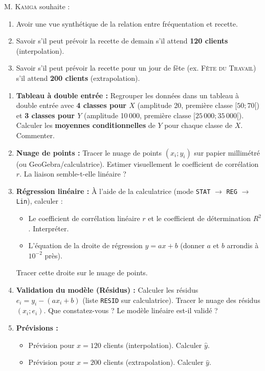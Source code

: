 \documentclass[11pt]{article}
\newcounter{popsec}
\newcounter{popsub}
\newcommand{\courssub}[1]{%
  \stepcounter{popsub}%
  \par\vspace{9pt}\noindent{\popxbold\fontsize{11.5}{13}\selectfont\color{popink}{\color{poporange}\thepopsec.\thepopsub}\hspace{6pt}#1}\par\nopagebreak\vspace{4pt}
}
\begin{document}
M. \textsc{Kamga} souhaite :
\begin{enumerate}
    \item Avoir une vue synthétique de la relation entre fréquentation et recette.
    \item Savoir s'il peut prévoir la recette de demain s'il attend \textbf{120 clients} (interpolation).
    \item Savoir s'il peut prévoir la recette pour un jour de fête (ex. \textsc{Fête du Travail}) s'il attend \textbf{200 clients} (extrapolation).
\end{enumerate}

\courssub{Consignes}
\begin{enumerate}
    \item \textbf{Tableau à double entrée :} Regrouper les données dans un tableau à double entrée avec \textbf{4 classes pour $X$} (amplitude 20, première classe $[50;70[$) et \textbf{3 classes pour $Y$} (amplitude 10\,000, première classe $[25\,000;35\,000[$). Calculer les \textbf{moyennes conditionnelles} de $Y$ pour chaque classe de $X$. Commenter.
    \item \textbf{Nuage de points :} Tracer le nuage de points $(x_i; y_i)$ sur papier millimétré (ou GeoGebra/calculatrice). Estimer visuellement le coefficient de corrélation $r$. La liaison semble-t-elle linéaire ?
    \item \textbf{Régression linéaire :} À l'aide de la calculatrice (mode \texttt{STAT} $\to$ \texttt{REG} $\to$ \texttt{Lin}), calculer :
    \begin{itemize}
        \item Le coefficient de corrélation linéaire $r$ et le coefficient de détermination $R^2$. Interpréter.
        \item L'équation de la droite de régression $y = ax + b$ (donner $a$ et $b$ arrondis à $10^{-2}$ près).
    \end{itemize}
    Tracer cette droite sur le nuage de points.
    \item \textbf{Validation du modèle (Résidus) :} Calculer les résidus $e_i = y_i - (ax_i + b)$ (liste \texttt{RESID} sur calculatrice). Tracer le nuage des résidus $(x_i; e_i)$. Que constatez-vous ? Le modèle linéaire est-il validé ?
    \item \textbf{Prévisions :}
    \begin{itemize}
        \item Prévision pour $x = 120$ clients (interpolation). Calculer $\hat{y}$.
        \item Prévision pour $x = 200$ clients (extrapolation). Calculer $\hat{y}$.

\end{itemize}
\end{enumerate}
\end{document}
